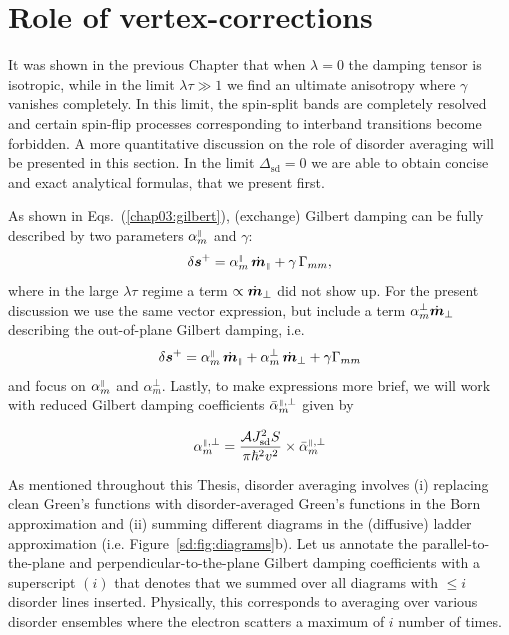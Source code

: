 \section{Role of vertex-corrections}
It was shown in the previous Chapter that when $\lambda=0$ the damping tensor is isotropic, while in the limit $\lambda\tau\gg 1$ we find an ultimate anisotropy where $\gamma$ vanishes completely. In this limit, the spin-split bands are completely resolved and certain spin-flip processes corresponding to interband transitions become forbidden. A more quantitative discussion on the role of disorder averaging will be presented in this section. In the limit $\Delta_\text{sd}=0$ we are able to obtain concise and exact analytical formulas, that we present first. 


As shown in Eqs.~(\ref{chap03:gilbert}), (exchange) Gilbert damping can be fully described by two parameters $\alpha_m^{{\scriptscriptstyle\parallel}}$ and $\gamma$: 
\begin{equation}
\delta\boldsymbol{s}^+ = \alpha_m^{{\scriptscriptstyle\parallel}}\, \dot{\boldsymbol{m}}_{{\scriptscriptstyle\parallel}} + \gamma\, \Gamma_{mm},
\end{equation}
where in the large $\lambda\tau$ regime a term $\propto \dot{\boldsymbol{m}}_\perp$ did not show up. For the present discussion we use the same vector expression, but include a term $\alpha_m^\perp\dot{\boldsymbol{m}}_\perp$ describing the out-of-plane Gilbert damping, i.e.
\begin{equation}
\delta\boldsymbol{s}^+  = \alpha_m^{{\scriptscriptstyle\parallel}}\,\dot{\boldsymbol{m}}_{\scriptscriptstyle\parallel} + \alpha_m^{\perp}\,\dot{\boldsymbol{m}}_{\perp} + \gamma\Gamma_{mm} 
\end{equation}and focus on $\alpha_m^{{\scriptscriptstyle\parallel}}$ and $\alpha_m^{\perp}$. Lastly, to make expressions more brief, we will work with reduced Gilbert damping coefficients $\bar{\alpha}_m^{{\scriptscriptstyle\parallel},\perp}$ given by


\begin{equation}
    \alpha_m^{{\scriptscriptstyle\parallel},\perp} = \frac{\mathcal{A}J_\text{sd}^2S}{\pi\hbar^2v^2}\times\bar{\alpha}_m^{{\scriptscriptstyle\parallel},\perp}  
\end{equation}

As mentioned throughout this Thesis, disorder averaging involves (i) replacing clean Green's functions with disorder-averaged Green's functions in the Born approximation and (ii) summing different diagrams in the (diffusive) ladder approximation (i.e. Figure~\ref{sd:fig:diagrams}b). Let us annotate the parallel-to-the-plane and perpendicular-to-the-plane Gilbert damping coefficients with a superscript $(i)$ that denotes that we summed over all diagrams with $\leq i$ disorder lines inserted. Physically, this corresponds to averaging over various disorder ensembles where the electron scatters a maximum of $i$ number of times. 

